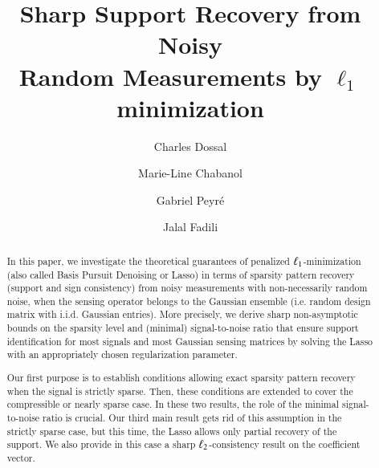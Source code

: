 \documentclass[preprint,11pt]{elsarticle}
\begin{document}
\begin{frontmatter}
\title{Sharp Support Recovery from Noisy\\Random Measurements by $\ell_1$ minimization}

\author[cd]{Charles Dossal} 

\author[cd]{Marie-Line Chabanol}

\author[gp]{Gabriel Peyr\'e} 

\author[jf]{Jalal Fadili} 

\address[cd]{IMB Universit\'e Bordeaux 1,\\351, cours de la Lib\'eration F-33405 Talence cedex, France}
\address[gp]{CNRS and CEREMADE, Universit\'e Paris-Dauphine,\\Place du Mar\'echal De Lattre De Tassigny, 75775 Paris Cedex 16, France}
\address[jf]{GREYC, CNRS-ENSICAEN-Universit\'e Caen,\\6 Bd du Mar\'echal Juin 14050 Caen Cedex, France}


\begin{abstract}
In this paper, we investigate the theoretical guarantees of penalized $\ell_1$-minimization (also called Basis Pursuit Denoising or Lasso) in terms of sparsity pattern recovery (support and sign consistency) from noisy measurements with non-necessarily random noise, when the sensing operator belongs to the Gaussian ensemble (i.e. random design matrix with i.i.d. Gaussian entries). More precisely, we derive sharp non-asymptotic bounds on the sparsity level and (minimal) signal-to-noise ratio that ensure support identification for most signals and most Gaussian sensing matrices by solving the Lasso with an appropriately chosen regularization parameter.  

Our first purpose is to establish conditions allowing exact sparsity pattern recovery when the signal is strictly sparse. Then, these conditions are extended to cover the compressible or nearly sparse case. In these two results, the role of the minimal signal-to-noise ratio is crucial. Our third main result gets rid of this assumption in the strictly sparse case, but this time, the Lasso allows only partial recovery of the support. We also provide in this case a sharp $\ell_2$-consistency result on the coefficient vector.


\end{abstract}
\end{frontmatter}
\end{document}
